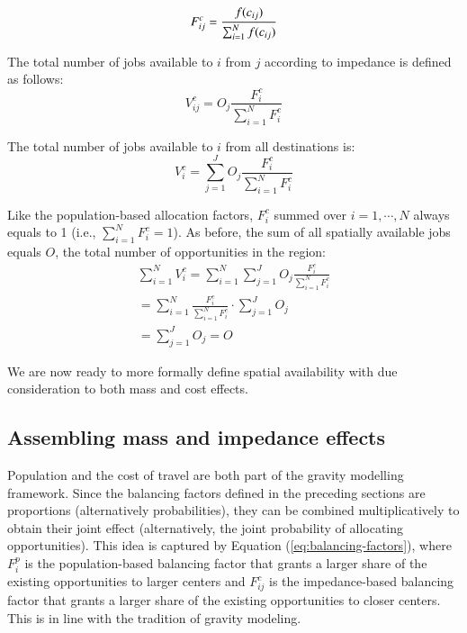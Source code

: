 \documentclass[]{elsarticle} %
\begin{document}
\begin{equation}
\label{eq:impedance-balancing-factor}
F^c_{ij} = \frac{f(c_{ij})}{\sum_{i=1}^N f(c_{ij})}\\
\end{equation}

The total number of jobs available to \(i\) from \(j\) according to
impedance is defined as follows: \[
V^c_{ij} = O_j\frac{F^c_{i}}{\sum_{i=1}^N F^c_{i}}
\]

The total number of jobs available to \(i\) from all destinations is: \[
V^c_{i} = \sum_{j=1}^J O_j\frac{F^c_{i}}{\sum_{i=1}^N F^c_{i}}
\]

Like the population-based allocation factors, \(F^c_{i}\) summed over
\(i=1,\cdots,N\) always equals to 1 (i.e.,
\(\sum_{i=1}^{N} F^c_{i} = 1\)). As before, the sum of all spatially
available jobs equals \(O\), the total number of opportunities in the
region: \[
\begin{array}{l}
\sum_{i=1}^N V^c_i =\sum_{i=1}^N\sum_{j=1}^JO_j\frac{F^c_{i}}{\sum_{i=1}^N F^c_{i}}\\
=\sum_{i=1}^N \frac{F^c_{i}}{\sum_{i=1}^N F^c_{i}}\cdot\sum_{j=1}^JO_j\\
=\sum_{j=1}^J O_j = O
\end{array}
\]

We are now ready to more formally define spatial availability with due
consideration to both mass and cost effects.

\hypertarget{assembling-mass-and-impedance-effects}{%
\subsection{Assembling mass and impedance
effects}\label{assembling-mass-and-impedance-effects}}

Population and the cost of travel are both part of the gravity modelling
framework. Since the balancing factors defined in the preceding sections
are proportions (alternatively probabilities), they can be combined
multiplicatively to obtain their joint effect (alternatively, the joint
probability of allocating opportunities). This idea is captured by
Equation (\ref{eq:balancing-factors}), where \(F^p_{i}\) is the
population-based balancing factor that grants a larger share of the
existing opportunities to larger centers and \(F^c_{ij}\) is the
impedance-based balancing factor that grants a larger share of the
existing opportunities to closer centers. This is in line with the
tradition of gravity modeling.
\end{document}
